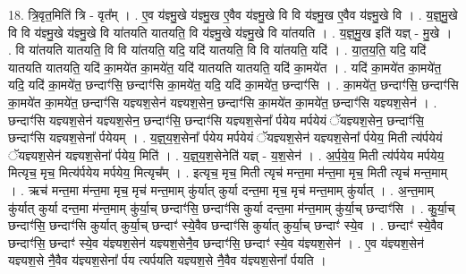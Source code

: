 \documentclass[17pt]{extarticle}
\begin{document}
18. त्रि॒वृत॒मिति॑ त्रि - वृत᳚म् । . ए॒व य॑ज्ञ्मु॒खे य॑ज्ञ्मु॒ख ए॒वैव य॑ज्ञ्मु॒खे वि वि य॑ज्ञ्मु॒ख ए॒वैव य॑ज्ञ्मु॒खे वि । . य॒ज्ञ्॒मु॒खे वि वि य॑ज्ञ्मु॒खे य॑ज्ञ्मु॒खे वि या॑तयति यातयति॒ वि य॑ज्ञ्मु॒खे य॑ज्ञ्मु॒खे वि या॑तयति । . य॒ज्ञ्॒मु॒ख इति॑ यज्ञ् - मु॒खे । . वि या॑तयति यातयति॒ वि वि या॑तयति॒ यदि॒ यदि॑ यातयति॒ वि वि या॑तयति॒ यदि॑ । . या॒त॒य॒ति॒ यदि॒ यदि॑ यातयति यातयति॒ यदि॑ का॒मये॑त का॒मये॑त॒ यदि॑ यातयति यातयति॒ यदि॑ का॒मये॑त । . यदि॑ का॒मये॑त का॒मये॑त॒ यदि॒ यदि॑ का॒मये॑त॒ छन्दाꣳ॑सि॒ छन्दाꣳ॑सि का॒मये॑त॒ यदि॒ यदि॑ का॒मये॑त॒ छन्दाꣳ॑सि । . का॒मये॑त॒ छन्दाꣳ॑सि॒ छन्दाꣳ॑सि का॒मये॑त का॒मये॑त॒ छन्दाꣳ॑सि यज्ञ्यश॒सेन॑ यज्ञ्यश॒सेन॒ छन्दाꣳ॑सि का॒मये॑त का॒मये॑त॒ छन्दाꣳ॑सि यज्ञ्यश॒सेन॑ । . छन्दाꣳ॑सि यज्ञ्यश॒सेन॑ यज्ञ्यश॒सेन॒ छन्दाꣳ॑सि॒ छन्दाꣳ॑सि यज्ञ्यश॒सेना᳚ र्पयेय मर्पयेयं ॅयज्ञ्यश॒सेन॒ छन्दाꣳ॑सि॒ छन्दाꣳ॑सि यज्ञ्यश॒सेना᳚ र्पयेयम् । . य॒ज्ञ्॒य॒श॒सेना᳚ र्पयेय मर्पयेयं ॅयज्ञ्यश॒सेन॑ यज्ञ्यश॒सेना᳚ र्पयेय॒ मिती त्य॑र्पयेयं ॅयज्ञ्यश॒सेन॑ यज्ञ्यश॒सेना᳚ र्पयेय॒ मिति॑ । . य॒ज्ञ्॒य॒श॒सेनेति॑ यज्ञ् - य॒श॒सेन॑ । . अ॒र्प॒ये॒य॒ मिती त्य॑र्पयेय मर्पयेय॒ मित्यृच॒ मृच॒ मित्य॑र्पयेय मर्पयेय॒ मित्यृच᳚म् । . इत्यृच॒ मृच॒ मिती त्यृच॑ मन्त॒मा म॑न्त॒मा मृच॒ मिती त्यृच॑ मन्त॒माम् । . ऋच॑ मन्त॒मा म॑न्त॒मा मृच॒ मृच॑ मन्त॒माम् कु॑र्यात् कुर्या दन्त॒मा मृच॒ मृच॑ मन्त॒माम् कु॑र्यात् । . अ॒न्त॒माम् कु॑र्यात् कुर्या दन्त॒मा म॑न्त॒माम् कु॑र्या॒च् छन्दाꣳ॑सि॒ छन्दाꣳ॑सि कुर्या दन्त॒मा म॑न्त॒माम् कु॑र्या॒च् छन्दाꣳ॑सि । . कु॒र्या॒च् छन्दाꣳ॑सि॒ छन्दाꣳ॑सि कुर्यात् कुर्या॒च् छन्दाꣳ॑ स्ये॒वैव छन्दाꣳ॑सि कुर्यात् कुर्या॒च् छन्दाꣳ॑ स्ये॒व । . छन्दाꣳ॑ स्ये॒वैव छन्दाꣳ॑सि॒ छन्दाꣳ॑ स्ये॒व य॑ज्ञ्यश॒सेन॑ यज्ञ्यश॒सेनै॒व छन्दाꣳ॑सि॒ छन्दाꣳ॑ स्ये॒व य॑ज्ञ्यश॒सेन॑ । . ए॒व य॑ज्ञ्यश॒सेन॑ यज्ञ्यश॒से नै॒वैव य॑ज्ञ्यश॒सेना᳚ र्पय त्यर्पयति यज्ञ्यश॒से नै॒वैव य॑ज्ञ्यश॒सेना᳚ र्पयति । \newline
\end{document}
